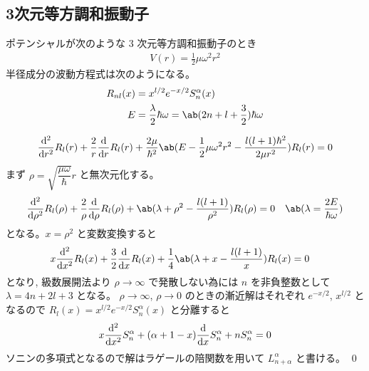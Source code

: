 \documentclass[uplatex,dvipdfmx,a4paper,11pt]{jlreq}
\makeatletter
\numberwithin{equation}{section}
\theoremstyle{definition}
\renewenvironment{proof}[1][\proofname]{\par
  \normalfont
  \topsep6\p@\@plus6\p@ \trivlist
  \item[\hskip\labelsep{\bfseries #1}\@addpunct{\bfseries}]\ignorespaces\quad\par
}{%
  \qed\endtrivlist\@endpefalse
}
\renewcommand\proofname{証明}
\makeatother
\begin{document}
\subsection{3次元等方調和振動子}
\begin{proposition}
  ポテンシャルが次のような 3 次元等方調和振動子のとき
  \begin{align}
    V(r) = \frac{1}{2}\mu\omega^2r^2
  \end{align}
  半径成分の波動方程式は次のようになる。
  \begin{align}
    R_{nl}(x) & = x^{l/2}e^{-x/2}S_n^\alpha(x)                                        \\
    E         & = \frac{\lambda}{2}\hbar\omega = \ab(2n + l + \frac{3}{2})\hbar\omega
  \end{align}
\end{proposition}
\begin{proof}
  \begin{align}
    \dv[2]{r}R_l(r) + \frac{2}{r}\dv{r}R_l(r) + \frac{2\mu}{\hbar^2}\ab(E - \frac{1}{2}\mu\omega^2r^2 - \frac{l(l+1)\hbar^2}{2\mu r^2})R_l(r) = 0
  \end{align}
  まず $\rho = \sqrt{\dfrac{\mu\omega}{\hbar}}r$ と無次元化する。
  \begin{align}
    \dv[2]{\rho}R_l(\rho) + \frac{2}{\rho}\dv{\rho}R_l(\rho) + \ab(\lambda + \rho^2 - \frac{l(l+1)}{\rho^2})R_l(\rho) & = 0 & \ab(\lambda = \frac{2E}{\hbar\omega})
  \end{align}
  となる。$x = \rho^2$ と変数変換すると
  \begin{align}
     & x\dv[2]{x}R_l(x) + \frac{3}{2}\dv{x}R_l(x) + \frac{1}{4}\ab(\lambda + x - \frac{l(l+1)}{x})R_l(x) = 0
  \end{align}
  となり, 級数展開法より $\rho\to\infty$ で発散しない為には $n$ を非負整数として $\lambda = 4n + 2l + 3$ となる。
  $\rho\to\infty$, $\rho\to 0$ のときの漸近解はそれぞれ $e^{-x/2}$, $x^{l/2}$ となるので $R_l(x) = x^{l/2}e^{-x/2}S_n^\alpha(x)$ と分離すると
  \begin{align}
    x\dv[2]{x}S_n^\alpha + (\alpha + 1 - x)\dv{x}S_n^\alpha + nS_n^\alpha = 0
  \end{align}
  ソニンの多項式となるので解はラゲールの陪関数を用いて $L_{n + \alpha}^\alpha$ と書ける。
\end{proof}
\end{document}
